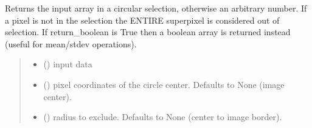 \documentclass[letterpaper,10pt,english]{sphinxmanual}
\begin{document}
\begin{fulllineitems}
\label{\detokenize{micropolarray.processing:micropolarray.processing.nrgf.roi_from_polar}}
\pysigstartsignatures
{}
\pysigstopsignatures
\sphinxAtStartPar
Returns the input array in a circular selection, otherwise an arbitrary number. If a pixel is not in the selection the ENTIRE superpixel is considered out of selection. If return\_boolean is True then a boolean array is returned instead (useful for mean/stdev operations).
\begin{quote}\begin{description}
\begin{itemize}
\item {} 
\sphinxAtStartPar
{} () \textendash{} input data

\item {} 
\sphinxAtStartPar
{} (\sphinxstyleliteralemphasis{\sphinxupquote{, }}) \textendash{} pixel coordinates of the circle center. Defaults to None (image center).

\item {} 
\sphinxAtStartPar
{} (\sphinxstyleliteralemphasis{\sphinxupquote{, }}) \textendash{} radius to exclude. Defaults to None (center to image border).


\end{itemize}
\end{description}
\end{quote}
\end{fulllineitems}
\end{document}
